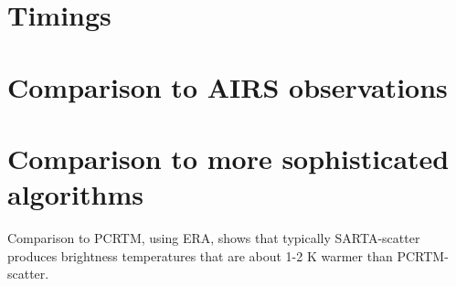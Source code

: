 \documentclass[11pt]{article}
\newcommand{\sasc}{\textsf{SARTA-scatter}\xspace}
\begin{document}
\section{Timings}

\section{Comparison to AIRS observations}

\section{Comparison to more sophisticated algorithms}

Comparison to PCRTM, using ERA, shows that typically \sasc produces brightness temperatures that are about 1-2 K warmer 
than PCRTM-scatter.



\end{document}
